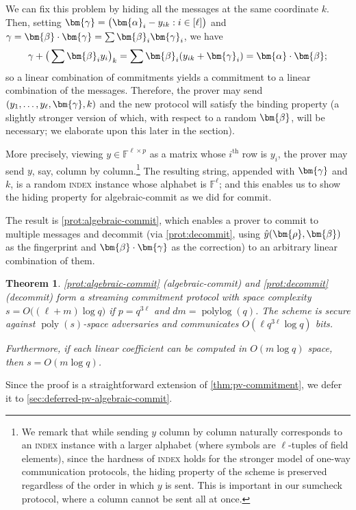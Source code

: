 \documentclass[a4paper,UKenglish,cleveref, autoref, thm-restate]{lipics-v2021}
\newtheorem{theorem}{Theorem}[section]
\theoremstyle{definition}
\newcommand{\field}{\mathbb{F}}
\newcommand{\poly}{\operatorname{poly}}
\newcommand{\polylog}{\operatorname{polylog}}
\newcommand{\indexproblem}{\normalfont\textsc{index}\xspace}
\newcommand{\pcommitlength}{p}
\newcommand{\pcommitstring}{y}
\newcommand{\dimension}{m}
\newcommand{\degree}{d}
\newcommand{\fieldsize}{q}
\newcommand{\evaluationpoint}{\bm{\fe2}}
\newcommand{\fingerprinttuple}{\bm{\rho}}
\def\fe#1{
    \ifnum#1=1
        \alpha
    \else
    \ifnum#1=2
        \beta
    \else
    \ifnum#1=3
        \gamma
    \fi\fi\fi
}
\begin{document}
We can fix this problem by hiding all the messages at the same coordinate $k$. Then, setting $\bm{\fe3} = \big(\bm{\fe1}_i - \pcommitstring_{ik} : i \in [\ell]\big)$ and $\fe3 = \bm{\fe2} \cdot \bm{\fe3} = \sum \bm{\fe2}_i \bm{\fe3}_i$, we have
\begin{equation*}
    \fe3 + \big(\sum \evaluationpoint_i \pcommitstring_i\big)_k = \sum \evaluationpoint_i (\pcommitstring_{ik} + \bm{\fe3}_i) = \bm{\fe1} \cdot \evaluationpoint;
\end{equation*}
so a linear combination of commitments yields a commitment to a linear combination of the messages. Therefore, the prover may send $(\pcommitstring_1, \ldots, \pcommitstring_\ell, \bm{\fe3}, k)$ and the new protocol will satisfy the binding property (a slightly stronger version of which, with respect to a random $\evaluationpoint$, will be necessary; we elaborate upon this later in the section).

More precisely, viewing $\pcommitstring \in \field^{\ell \times \pcommitlength}$ as a matrix whose $i^\text{th}$ row is $\pcommitstring_i$, the prover may send $\pcommitstring$, say, column by column.\footnote{We remark that while sending $\pcommitstring$ column by column naturally corresponds to an \indexproblem instance with a larger alphabet (where symbols are $\ell$-tuples of field elements), since the hardness of \indexproblem holds for the stronger model of one-way communication protocols, the hiding property of the scheme is preserved regardless of the order in which $\pcommitstring$ is sent. This is important in our sumcheck protocol, where a column cannot be sent all at once.} The resulting string, appended with $\bm{\fe3}$ and $k$, is a random \indexproblem instance whose alphabet is $\field^\ell$; and this enables us to show the hiding property for \textsf{algebraic-commit} as we did for \textsf{commit}.

The result is \cref{prot:algebraic-commit}, which enables a prover to commit to multiple messages and decommit (via \cref{prot:decommit}, using $\hat \pcommitstring(\fingerprinttuple, \bm{\fe2})$ as the fingerprint and $\bm{\fe2} \cdot \bm{\fe3}$ as the correction) to an arbitrary linear combination of them.

\begin{theorem}
    \label{thm:pv-algebraic-commitment}
    \cref{prot:algebraic-commit} (\textsf{algebraic-commit}) and \cref{prot:decommit} (\textsf{decommit}) form a streaming commitment protocol with space complexity $s = O\big((\ell + \dimension) \log \fieldsize\big)$ if $\pcommitlength = \fieldsize^{3\ell}$ and $\degree \dimension = \polylog(\fieldsize)$. The scheme is secure against $\poly(s)$-space adversaries and communicates $O(\ell \fieldsize^{3 \ell} \log \fieldsize)$ bits.
    
    Furthermore, if each linear coefficient can be computed in $O(\dimension \log \fieldsize)$ space, then $s = O(\dimension \log \fieldsize)$.
\end{theorem}
Since the proof is a straightforward extension of \cref{thm:pv-commitment}, we defer it to \cref{sec:deferred-pv-algebraic-commit}.
\end{document}
